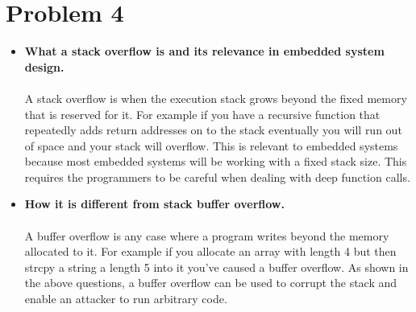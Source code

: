 \documentclass[11pt]{article}
\begin{document}
\newpage
\section*{Problem 4}
\begin{itemize}
    \item \textbf{
            What a stack overflow is and its relevance in embedded system design.
        }\\\\
        A stack overflow is when the execution stack grows beyond the fixed memory
        that is reserved for it. For example if you have a recursive function that
        repeatedly adds return addresses on to the stack eventually you will run
        out of space and your stack will overflow. This is relevant to embedded
        systems because most embedded systems will be working with a fixed stack
        size. This requires the programmers to be careful when dealing with deep
        function calls.
    \item \textbf{
            How it is different from stack buffer overflow.
        }\\\\
        A buffer overflow is any case where a program writes beyond the memory
        allocated to it. For example if you allocate an array with length 4 but
        then strcpy a string a length 5 into it you've caused a buffer overflow.
        As shown in the above questions, a buffer overflow can be used to corrupt
        the stack and enable an attacker to run arbitrary code.
\end{itemize}
\end{document}
